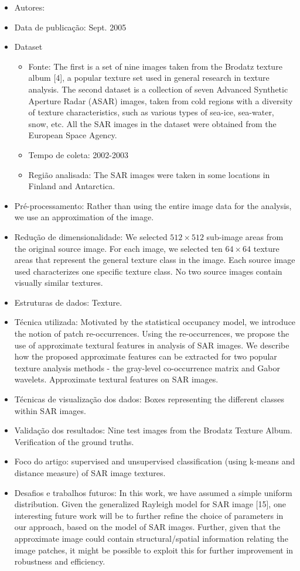 \documentclass[paper=a4, fontsize=11pt]{scrartcl}
\begin{document}
\begin{itemize}
    \item Autores:~\cite{kandaswamy2005efficient}
    \item Data de publicação: Sept. 2005
    \item Dataset
    \begin{itemize}
        \item Fonte: The first is a set of nine images taken from the Brodatz texture album [4], a popular texture set used in general research in texture analysis. The second dataset is a collection of seven Advanced Synthetic Aperture Radar (ASAR) images, taken from cold regions with a diversity of texture characteristics, such as various types of sea-ice, sea-water, snow, etc. All the SAR images in the dataset were obtained from the European Space Agency.
        \item Tempo de coleta: 2002-2003
        \item Região analisada: The SAR images were taken in some locations in Finland and Antarctica.
    \end{itemize}
    \item Pré-processamento: Rather than using the entire image data for the analysis, we use an approximation of the image.
    \item Redução de dimensionalidade: We selected $512 \times 512$ sub-image areas from the original source image. For each image, we selected ten $64 \times 64$ texture areas that represent the general texture class in the image. Each source image used characterizes one specific texture class. No two source images contain visually similar textures.
    \item Estruturas de dados: Texture.
    \item Técnica utilizada: Motivated by the statistical occupancy model, we introduce the notion of patch re-occurrences. Using the re-occurrences, we propose the use of approximate textural features in analysis of SAR images. We describe how the proposed approximate features can be extracted for two popular texture analysis methods - the gray-level co-occurrence matrix and Gabor wavelets. Approximate textural features on SAR images.
    \item Técnicas de visualização dos dados: Boxes representing the different classes within SAR images.
    \item Validação dos resultados: Nine test images from the Brodatz Texture Album. Verification of the ground truths.
    \item Foco do artigo: supervised and unsupervised classification (using k-means and distance measure) of SAR image textures.
    \item Desafios e trabalhos futuros: In this work, we have assumed a simple uniform distribution. Given the generalized Rayleigh model for SAR image [15], one interesting future work will be to further refine the choice of parameters in our approach, based on the model of SAR images. Further, given that the approximate image could contain structural/spatial information relating the image patches, it might be possible to exploit this for further improvement in robustness and efficiency.
\end{itemize}
\end{document}
